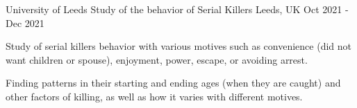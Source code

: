 \begin{cventries}
  \cventry
    {University of Leeds} %
    {Study of the behavior of Serial Killers} %
    {Leeds, UK} %
    {Oct 2021 - Dec 2021} %
    {
      \begin{cvitems} %
        \item {Study of serial killers behavior with various motives such as convenience (did not want children or spouse), enjoyment, power, escape, or avoiding arrest.}
        \item {Finding patterns in their starting and ending ages (when they are caught) and other factors of killing, as well as how it varies with different motives.}
      \end{cvitems}
    }

\end{cventries}
